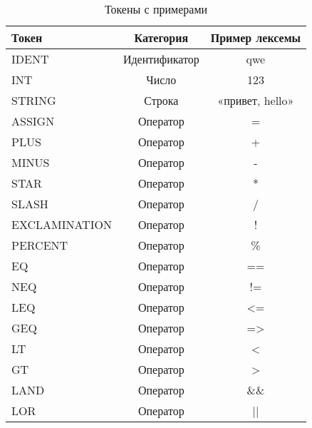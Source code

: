\begin{table}[h!]
    \Large
    \centering
    \begin{threeparttable}
        \caption{Токены с примерами}
        \label{t:tokens}
        \begin{tabularx}{\textwidth}{|X|c|c|}
            \hline
            Токен         & Категория      & Пример лексемы  \\
            \hline
            IDENT         & Идентификатор  & qwe             \\
            \hline
            INT           & Число          & 123             \\
            \hline
            STRING        & Строка         & «привет, hello» \\
            \hline
            ASSIGN        & Оператор       & =               \\
            \hline
            PLUS          & Оператор       & +               \\
            \hline
            MINUS         & Оператор       & -               \\
            \hline
            STAR          & Оператор       & *               \\
            \hline
            SLASH         & Оператор       & /               \\
            \hline
            EXCLAMINATION & Оператор       & !               \\
            \hline
            PERCENT       & Оператор       & \%              \\
            \hline
            EQ            & Оператор       & ==              \\
            \hline
            NEQ           & Оператор       & !=              \\
            \hline
            LEQ           & Оператор       & <=              \\
            \hline
            GEQ           & Оператор       & =>              \\
            \hline
            LT            & Оператор       & <               \\
            \hline
            GT            & Оператор       & >               \\
            \hline
            LAND          & Оператор       & \&\&            \\
            \hline
            LOR           & Оператор       & ||              \\

\end{tabularx}
\end{threeparttable}
\end{table}
